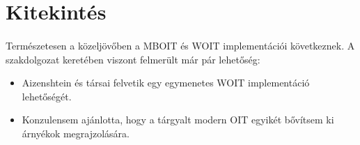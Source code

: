 \section{Kitekintés}
\paragraph{}Természetesen a közeljövőben a MBOIT és WOIT implementációi következnek. A szakdolgozat keretében viszont felmerült már pár lehetőség:
\begin{itemize}
	\item Aizenshtein és társai felvetik egy egymenetes WOIT implementáció lehetőségét.
	\item Konzulensem ajánlotta, hogy a tárgyalt modern OIT egyikét bővítsem ki árnyékok megrajzolására.
\end{itemize}